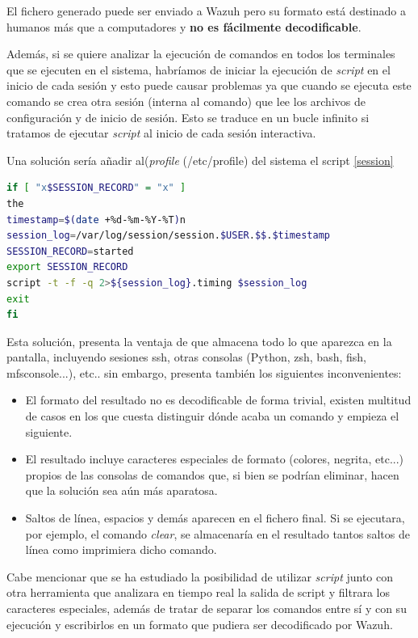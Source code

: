 El fichero generado puede ser enviado a Wazuh pero su formato está destinado a humanos más que a computadores y \textbf{no es fácilmente decodificable}.

Además, si se quiere analizar la ejecución de comandos en todos los terminales que se ejecuten en el sistema, habríamos de iniciar la ejecución de \textit{script} en el inicio de cada sesión y esto puede causar problemas ya que cuando se ejecuta este comando se crea otra sesión (interna al comando) que lee los archivos de configuración y de inicio de sesión. Esto se traduce en un bucle infinito si tratamos de ejecutar \textit{script} al inicio de cada sesión interactiva.

Una solución sería añadir al(\textit{profile} (/etc/profile) del sistema el script \ref{session}

\begin{lstlisting}[language=bash,caption={Session recorder (/etc/profile)}, label=session]
if [ "x$SESSION_RECORD" = "x" ]
the
timestamp=$(date +%d-%m-%Y-%T)n
session_log=/var/log/session/session.$USER.$$.$timestamp
SESSION_RECORD=started
export SESSION_RECORD
script -t -f -q 2>${session_log}.timing $session_log
exit
fi
\end{lstlisting}

Esta solución, presenta la ventaja de que almacena todo lo que aparezca en la pantalla, incluyendo sesiones ssh, otras consolas (Python, zsh, bash, fish, mfsconsole...), etc.. sin embargo, presenta también los siguientes inconvenientes:

\begin{itemize}
    \item El formato del resultado no es decodificable de forma trivial, existen multitud de casos en los que cuesta distinguir dónde acaba un comando y empieza el siguiente.
    \item El resultado incluye caracteres especiales de formato (colores, negrita, etc...) propios de las consolas de comandos que, si bien se podrían eliminar, hacen que la solución sea aún más aparatosa.
    \item Saltos de línea, espacios y demás aparecen en el fichero final. Si se ejecutara, por ejemplo, el comando \textit{clear}, se almacenaría en el resultado tantos saltos de línea como imprimiera dicho comando.
\end{itemize}

Cabe mencionar que se ha estudiado la posibilidad de utilizar \textit{script} junto con otra herramienta que analizara en tiempo real la salida de script y filtrara los caracteres especiales, además de tratar de separar los comandos entre sí y con su ejecución y escribirlos en un formato que pudiera ser decodificado por Wazuh.

